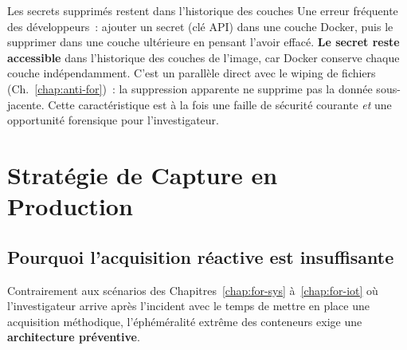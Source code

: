 \begin{boiteRemarque}{Les secrets supprimés restent dans l'historique des couches}
Une erreur fréquente des développeurs~: ajouter un secret (clé API)
dans une couche Docker, puis le supprimer dans une couche ultérieure
en pensant l'avoir effacé. \textbf{Le secret reste accessible} dans
l'historique des couches de l'image, car Docker conserve chaque
couche indépendamment. C'est un parallèle direct avec le wiping
de fichiers (Ch.~\ref{chap:anti-for})~: la suppression apparente
ne supprime pas la donnée sous-jacente. Cette caractéristique est
à la fois une faille de sécurité courante \emph{et} une opportunité
forensique pour l'investigateur.
\end{boiteRemarque}

\section{Stratégie de Capture en Production}
\label{sec:strategie-capture}

\subsection{Pourquoi l'acquisition réactive est insuffisante}

Contrairement aux scénarios des Chapitres~\ref{chap:for-sys}
à~\ref{chap:for-iot} où l'investigateur arrive après l'incident avec
le temps de mettre en place une acquisition méthodique, l'éphéméralité
extrême des conteneurs exige une \textbf{architecture préventive}.

